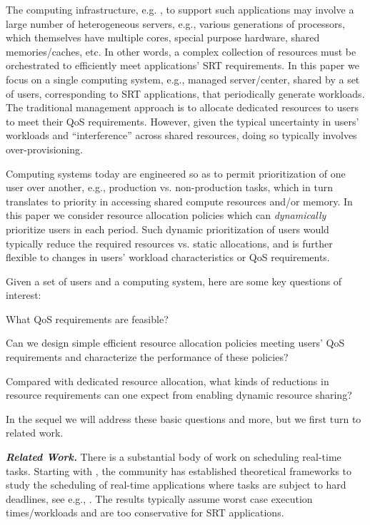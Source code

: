 \documentclass[prodmode,acmtompecs]{acmsmall}
\begin{document}
The computing infrastructure, e.g. \cite{VPK15A}, to support such applications may involve a large number of heterogeneous servers, e.g., 
various generations of processors, which themselves have multiple cores, special purpose hardware, shared memories/caches, etc. 
In other words, a complex collection of resources must be orchestrated to efficiently  
meet applications' SRT requirements. In this paper we focus on a single computing system, e.g., managed server/center, 
shared by a set of users, corresponding to SRT applications, that periodically generate workloads. The traditional management approach is to allocate dedicated resources to users to meet their QoS requirements. However, given the typical uncertainty in users' workloads and ``interference'' across shared resources, doing so typically involves over-provisioning. 

Computing systems today are engineered so as to permit prioritization 
of one user over another, e.g., production vs. non-production tasks, which in turn translates to priority in accessing
shared compute resources and/or memory. 
In this paper we consider resource allocation policies which can {\em dynamically} prioritize users in each period. 
Such dynamic prioritization of users would typically
reduce the required resources vs. static allocations, and is further flexible to changes in users' workload characteristics or QoS requirements.



Given a set of users and a computing system, here are some key questions of interest:
\begin{longitem}
\item What QoS requirements are feasible? 
\item Can we design simple efficient resource allocation policies meeting users' QoS requirements and characterize the performance of these policies? 
\item Compared with dedicated resource allocation, what kinds of reductions in resource requirements can one expect from enabling dynamic resource sharing? 
\end{longitem}

In the sequel we will address these basic questions and more, but we first turn to related work. 

{\bf \em Related Work. }
\label{subsection_related_work}
There is a substantial body of work on scheduling real-time tasks. 
Starting with \cite{LiL73}, the community has established theoretical frameworks to study the scheduling of real-time applications where tasks are subject to hard deadlines, see e.g., \cite{Liu00b,DaB11,CFH04,Leu89}. The results typically assume worst case execution times/workloads and are too conservative for SRT applications.  
\end{document}
